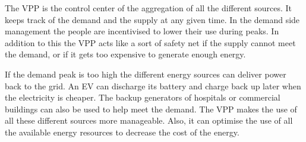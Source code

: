 The VPP is the control center of the aggregation of all the different sources. It keeps track of the demand and the supply at any given time. In the demand side management the people are incentivised to lower their use during peaks. In addition to this the VPP acts like a sort of safety net if the supply cannot meet the demand, or if it gets too expensive to generate enough energy. \cite{Kumagai2012}

If the demand peak is too high the different energy sources can deliver power back to the grid. An EV can discharge its battery and charge back up later when the electricity is cheaper. The backup generators of hospitals or commercial buildings can also be used to help meet the demand. The VPP makes the use of all these different sources more manageable. Also, it can optimise the use of all the available energy resources to decrease the cost of the energy.\cite{microgridsmarketenv}